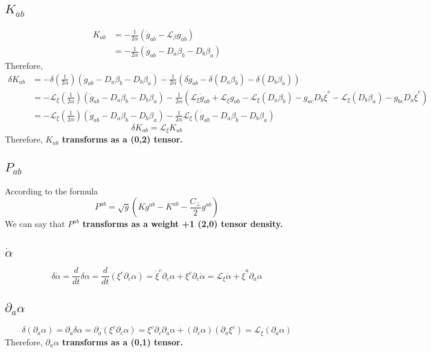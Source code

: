 \documentclass{article}
\begin{document}
\subsection{$K_{ab}$}
\begin{align*}
K_{ab} & = -\frac{1}{2\alpha}({\dot g}_{ab} - \mathcal{L}_{\beta}g_{ab})\\
& = -\frac{1}{2\alpha}({\dot g}_{ab} - D_{a}\beta_{b} - D_{b}\beta_{a})
\end{align*}
Therefore, 
\begin{align*}
\delta K_{ab} &= -\delta(\frac{1}{2\alpha})({\dot g}_{ab} - D_{a}\beta_{b} - D_{b}\beta_{a}) - \frac{1}{2\alpha}(\delta{\dot g}_{ab} - \delta(D_{a}\beta_{b}) - \delta(D_{b}\beta_{a}))\\
& = -\mathcal{L}_{\xi}(\frac{1}{2\alpha})({\dot g}_{ab} - D_{a}\beta_{b} - D_{b}\beta_{a})  - \frac{1}{2\alpha}(\mathcal{L}_{\xi}{\dot g}_{ab} + \mathcal{L}_{{\dot \xi}}g_{ab} - \mathcal{L}_{\xi}(D_{a}\beta_{b}) - g_{ac}D_{b}{\dot \xi}^{c} - \mathcal{L}_{\xi}(D_{b}\beta_{a}) - g_{bc}D_{a}{\dot \xi}^{c})\\
& = -\mathcal{L}_{\xi}(\frac{1}{2\alpha})({\dot g}_{ab} - D_{a}\beta_{b} - D_{b}\beta_{a})  - \frac{1}{2\alpha}\mathcal{L}_{\xi}({\dot g}_{ab} - D_{a}\beta_{b} - D_{b}\beta_{a})
\end{align*}
\[
\boxed{
\delta K_{ab} = \mathcal{L}_{\xi}K_{ab}
}
\]
Therefore, {\bf {\color{red}$K_{ab}$ transforms as a (0,2) tensor.}}
\subsection{$P_{ab}$}
According to the formula
\[
P^{ab} = \sqrt{g}(Kg^{ab} - K^{ab} - \frac{C_{\perp}}{2}g^{ab})
\]
We can say that {\bf {\color{red}$P^{ab}$ transforms as a weight +1 (2,0) tensor density.}}
\subsection{${\dot \alpha}$}
\[
\delta {\dot \alpha} = \frac{d}{dt} \delta \alpha = \frac{d}{dt}(\xi^{c}\partial_{c}\alpha) = {\dot \xi}^{c}\partial_{c}\alpha + \xi^{c}\partial_{c}{\dot \alpha} = \mathcal{L}_{\xi}{\dot \alpha} + {\dot \xi}^{a}\partial_{a}\alpha
\]
\subsection{$\partial_{a}\alpha$}
\[
\delta (\partial_{a}\alpha) = \partial_{a} \delta \alpha = \partial_{a} (\xi^{c}\partial_{c}\alpha) = \xi^{c}\partial_{c}\partial_{a}\alpha + (\partial_{c}\alpha)(\partial_{a}\xi^{c}) = \mathcal{L}_{\xi}(\partial_{a}\alpha)
\]
Therefore, {\bf {\color{red}$\partial_{a}\alpha$ transforms as a (0,1) tensor.}} 
\end{document}
